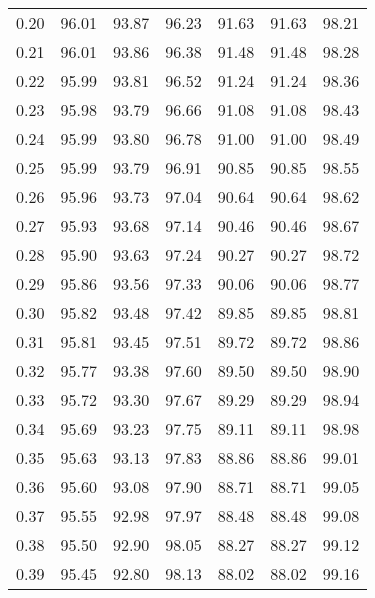 \begin{tabular}{|c|c|c|c|c|c|c|}
      0.20 &     96.01 &     93.87 &      96.23 &   91.63 &      91.63 &         98.21 \\
      0.21 &     96.01 &     93.86 &      96.38 &   91.48 &      91.48 &         98.28 \\
      0.22 &     95.99 &     93.81 &      96.52 &   91.24 &      91.24 &         98.36 \\
      0.23 &     95.98 &     93.79 &      96.66 &   91.08 &      91.08 &         98.43 \\
      0.24 &     95.99 &     93.80 &      96.78 &   91.00 &      91.00 &         98.49 \\
      0.25 &     95.99 &     93.79 &      96.91 &   90.85 &      90.85 &         98.55 \\
      0.26 &     95.96 &     93.73 &      97.04 &   90.64 &      90.64 &         98.62 \\
      0.27 &     95.93 &     93.68 &      97.14 &   90.46 &      90.46 &         98.67 \\
      0.28 &     95.90 &     93.63 &      97.24 &   90.27 &      90.27 &         98.72 \\
      0.29 &     95.86 &     93.56 &      97.33 &   90.06 &      90.06 &         98.77 \\
      0.30 &     95.82 &     93.48 &      97.42 &   89.85 &      89.85 &         98.81 \\
      0.31 &     95.81 &     93.45 &      97.51 &   89.72 &      89.72 &         98.86 \\
      0.32 &     95.77 &     93.38 &      97.60 &   89.50 &      89.50 &         98.90 \\
      0.33 &     95.72 &     93.30 &      97.67 &   89.29 &      89.29 &         98.94 \\
      0.34 &     95.69 &     93.23 &      97.75 &   89.11 &      89.11 &         98.98 \\
      0.35 &     95.63 &     93.13 &      97.83 &   88.86 &      88.86 &         99.01 \\
      0.36 &     95.60 &     93.08 &      97.90 &   88.71 &      88.71 &         99.05 \\
      0.37 &     95.55 &     92.98 &      97.97 &   88.48 &      88.48 &         99.08 \\
      0.38 &     95.50 &     92.90 &      98.05 &   88.27 &      88.27 &         99.12 \\
      0.39 &     95.45 &     92.80 &      98.13 &   88.02 &      88.02 &         99.16 \\

\end{tabular}
